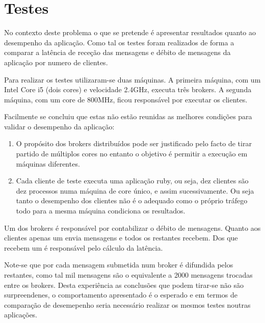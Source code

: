 \section{Testes}

No contexto deste problema o que se pretende é apresentar resultados quanto ao desempenho da aplicação. Como tal os testes foram realizados de forma a comparar a latência de receção das mensagens e débito de mensagens da aplicação por numero de clientes.

Para realizar os testes utilizaram-se duas máquinas. A primeira máquina, com um Intel Core i5 (dois cores) e velocidade 2.4GHz, executa três brokers. A segunda máquina, com um core de 800MHz, ficou responsável por executar os clientes.

Facilmente se concluiu que estas não estão reunidas as melhores condições para validar o desempenho da aplicação:
\begin{enumerate}
\item O propósito dos brokers distribuídos pode ser justificado pelo facto de tirar partido de múltiplos cores no entanto o objetivo é permitir a execução em máquinas diferentes.
\item Cada cliente de teste executa uma aplicação ruby, ou seja, dez clientes são dez processos numa máquina de core único, e assim sucessivamente. Ou seja tanto o desempenho dos clientes não é o adequado como o próprio tráfego todo para a mesma máquina condiciona os resultados.
\end{enumerate}

Um dos brokers é responsável por contabilizar o débito de mensagens. Quanto aos clientes apenas um envia mensagens e todos os restantes recebem. Dos que recebem um é responsável pelo cálculo da latência.

Note-se que por cada mensagem submetida num broker é difundida pelos restantes, como tal mil mensagens são o equivalente a 2000 mensagens trocadas entre os brokers.
Desta experiência as conclusões que podem tirar-se não são surpreendenes, o comportamento apresentado é o esperado e em termos de comparação de desemepenho seria necessário realizar os mesmos testes noutras aplicações.
